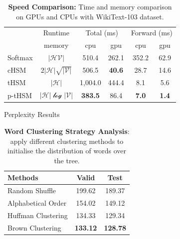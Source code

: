 \documentclass[final,t,unknownkeysallowed]{beamer}
\begin{document}
\begin{frame}{}
\begin{columns}[t]
\begin{column}{.3\linewidth}
    \begin{table}
    \centering
    \caption{\textbf{Speed Comparison:} Time and memory comparison on GPUs and CPUs with WikiText-103 dataset.}
    \begin{tabular}{lccccc}
    \toprule
    &Runtime &\multicolumn{2}{c}{Total (ms)} & \multicolumn{2}{c}{Forward (ms)}   \\
    \cmidrule(lr){3-4}  \cmidrule(lr){5-6}
	&memory &cpu&gpu &cpu&	gpu \\ \midrule
    Softmax & $\mathcal{|HV|}$ &510.4  &262.1&352.2& 62.9 \\
    cHSM    & $2\mathcal{|H|\sqrt{|V|}}$&506.5  &\textbf{40.6}&28.7&14.6 \\
    tHSM    &$\mathcal{|H|}$&1,004.0 &444.4 & 8.1&  5.6   \\
    p-tHSM  &$\mathcal{|H|\log{|V|}}$ &\textbf{383.5}&	86.4 &\textbf{7.0}&	\textbf{1.4} \\
    \bottomrule
    \end{tabular}
    \end{table}

      \begin{block}{Perplexity Results}
    \begin{table}
  \centering
  \caption{\textbf{Word Clustering Strategy Analysis}: apply different clustering methods to initialise the distribution of words over the tree.}
  \begin{tabular}{lcc} \toprule
  Methods   & Valid & Test   \\ \midrule
  Random Shuffle &199.62 &  189.37\\
  Alphabetical Order  & 154.02 & 149.12       \\
  Huffman Clustering   & 134.33 & 129.34      \\
  Brown Clustering  & \textbf{133.12} & \textbf{128.78}\\
\bottomrule
  \end{tabular}
\end{table}

\vspace{3ex}


\end{block}
\end{column}
\end{columns}
\end{frame}
\end{document}
